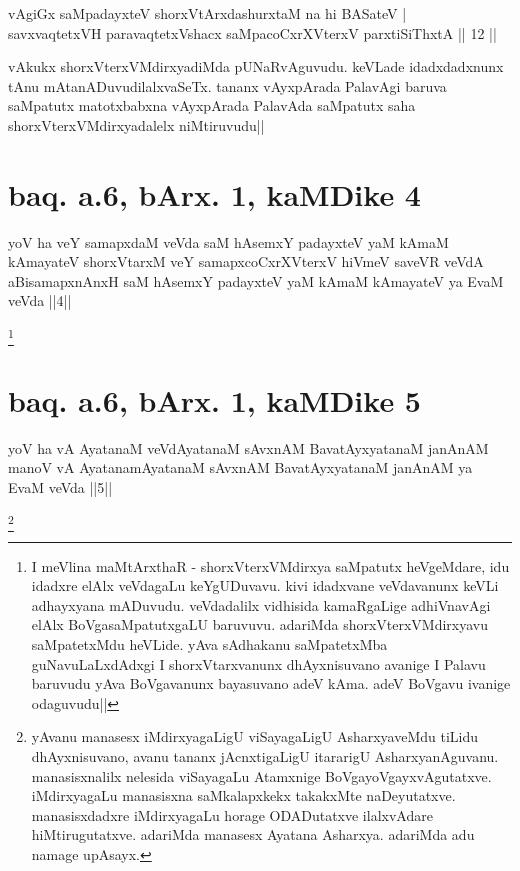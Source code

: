 \begin{shl}
vAgiGx saMpadayxteV shorxVtArxdashurxtaM na hi BASateV | \\
savxvaqtetxVH paravaqtetxVshacx saMpacoCxrXVterxV parxtiSiThxtA \hfill|| 12 || 
\end{shl}

\begin{artha} 
vAkukx shorxVterxVMdirxyadiMda pUNaRvAguvudu. keVLade idadxdadxnunx 
tAnu mAtanADuvudilalxvaSeTx. tananx vAyxpArada PalavAgi baruva 
saMpatutx matotxbabxna vAyxpArada PalavAda saMpatutx saha 
shorxVterxVMdirxyadalelx niMtiruvudu||
\end{artha}

\section*{baq. a.6, bArx. 1, kaMDike 4}

\begin{shl}
yoV ha veY samapxdaM veVda saM hAsemxY padayxteV yaM kAmaM kAmayateV shorxVtarxM veY samapxcoCxrXVterxV hiVmeV saveVR veVdA aBisamapxnAnxH saM hAsemxY padayxteV yaM kAmaM kAmayateV ya EvaM veVda ||4||
\end{shl}

\footnote[1]{I meVlina maMtArxthaR - shorxVterxVMdirxya saMpatutx 
heVgeMdare, idu idadxre elAlx veVdagaLu keYgUDuvavu. kivi idadxvane 
veVdavanunx keVLi adhayxyana mADuvudu. veVdadalilx vidhisida 
kamaRgaLige adhiVnavAgi elAlx BoVgasaMpatutxgaLU baruvuvu. adariMda 
shorxVterxVMdirxyavu saMpatetxMdu heVLide. yAva sAdhakanu saMpatetxMba 
guNavuLaLxdAdxgi I shorxVtarxvanunx dhAyxnisuvano avanige I Palavu 
baruvudu yAva BoVgavanunx bayasuvano adeV kAma. adeV BoVgavu ivanige 
odaguvudu||}\stext

\section*{baq. a.6, bArx. 1, kaMDike 5}

\begin{shl}
yoV ha vA AyatanaM veVdAyatanaM sAvxnAM BavatAyxyatanaM janAnAM manoV vA AyatanamAyatanaM sAvxnAM BavatAyxyatanaM janAnAM ya EvaM veVda ||5||
\end{shl}

\footnote[1]{yAvanu manasesx iMdirxyagaLigU viSayagaLigU AsharxyaveMdu 
tiLidu dhAyxnisuvano, avanu tananx jAcnxtigaLigU itararigU 
AsharxyanAguvanu. manasisxnalilx nelesida viSayagaLu Atamxnige 
BoVgayoVgayxvAgutatxve. iMdirxyagaLu manasisxna saMkalapxkekx 
takakxMte naDeyutatxve. manasisxdadxre iMdirxyagaLu horage ODADutatxve 
ilalxvAdare hiMtirugutatxve. adariMda manasesx Ayatana Asharxya. 
adariMda adu namage upAsayx.}\stext

